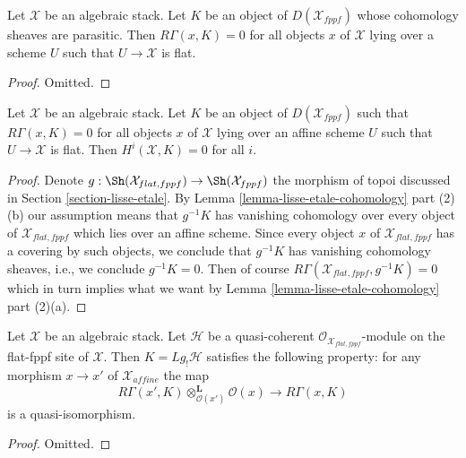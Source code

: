 \begin{lemma}
\label{lemma-cohomology-parasitic}
Let $\mathcal{X}$ be an algebraic stack. Let $K$ be an object of
$D(\mathcal{X}_{fppf})$ whose cohomology sheaves are parasitic. Then
$R\Gamma(x, K) = 0$ for all objects $x$ of $\mathcal{X}$ lying
over a scheme $U$ such that $U \to \mathcal{X}$ is flat.
\end{lemma}

\begin{proof}
Omitted.
\end{proof}

\begin{lemma}
\label{lemma-cohomology-parasitic-complex}
Let $\mathcal{X}$ be an algebraic stack. Let $K$ be an object of
$D(\mathcal{X}_{fppf})$ such that $R\Gamma(x, K) = 0$ for all objects
$x$ of $\mathcal{X}$ lying over an affine scheme $U$ such that
$U \to \mathcal{X}$ is flat. Then $H^i(\mathcal{X}, K) = 0$ for all $i$.
\end{lemma}

\begin{proof}
Denote $g : \Sh(\mathcal{X}_{flat, fppf}) \to \Sh(\mathcal{X}_{fppf})$
the morphism of topoi discussed in Section \ref{section-lisse-etale}.
By Lemma \ref{lemma-lisse-etale-cohomology} part (2)(b) our assumption
means that $g^{-1}K$ has vanishing cohomology over every object
of $\mathcal{X}_{flat, fppf}$ which lies over an affine scheme.
Since every object $x$ of $\mathcal{X}_{flat, fppf}$ has a covering
by such objects, we conclude that $g^{-1}K$ has vanishing cohomology
sheaves, i.e., we conclude $g^{-1}K = 0$. Then of course
$R\Gamma(\mathcal{X}_{flat, fppf}, g^{-1}K) = 0$ which in turn implies
what we want by Lemma \ref{lemma-lisse-etale-cohomology} part (2)(a).
\end{proof}

\begin{lemma}
\label{lemma-higher-shriek-QC}
Let $\mathcal{X}$ be an algebraic stack. Let $\mathcal{H}$ be a quasi-coherent
$\mathcal{O}_{\mathcal{X}_{flat,fppf}}$-module  on the flat-fppf site of
$\mathcal{X}$. Then $K = Lg_!\mathcal{H}$ satisfies the following property:
for any morphism $x \to x'$ of $\mathcal{X}_{affine}$ the map
$$
R\Gamma(x', K) \otimes_{\mathcal{O}(x')}^\mathbf{L} \mathcal{O}(x)
\longrightarrow
R\Gamma(x, K)
$$
is a quasi-isomorphism.
\end{lemma}

\begin{proof}
Omitted.
\end{proof}

